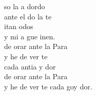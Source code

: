 \begin{cancion}%
	so la a dordo \\
	ante el do  la te\\
	itan  odos\\
	y mi a gue inen.\\
	 de orar ante la Para \\
	y he de ver te \\
	cada antia y dor\\
	 de orar ante la Para\\
	y he de ver te cada goy dor.\\
\end{cancion}%
